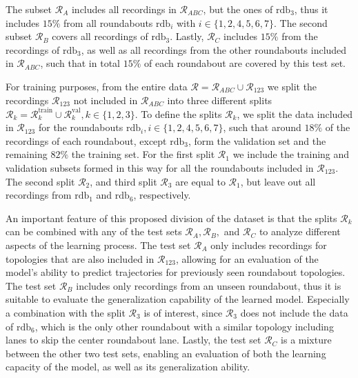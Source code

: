 \documentclass[a4paper, 10pt, conference]{ieeeconf}      %
\begin{document}
The subset $\mathcal{R}_A$ includes all recordings in $\mathcal{R}_{ABC}$, but the ones of $\text{rdb}_3$, thus it includes $15\%$ from all roundabouts $\text{rdb}_i$ with $i \in \{1,2,4,5,6,7\}$.
The second subset $\mathcal{R}_B$ covers all recordings of $\text{rdb}_3$.
Lastly, $\mathcal{R}_C$ includes $15\%$ from the recordings of $\text{rdb}_3$, as well as all recordings from the other roundabouts included in $\mathcal{R}_{ABC}$, such that in total $15\%$ of each roundabout are covered by this test set.


For training purposes, from the entire data \mbox{$\mathcal R = \mathcal R_{ABC} \cup \mathcal R_{123}$} we split the recordings $\mathcal R_{123}$ not included in $\mathcal{R}_{ABC}$ into three different splits \mbox{$\mathcal R_k={\mathcal R}_k^{\text{train}} \cup {\mathcal R}^\text{val}_k, k \in \{1,2,3\}$}.
To define the splits $\mathcal R_k$, we split the data included in $\mathcal R_{123}$ for the roundabouts $\text{rdb}_i, i \in \{1,2,4,5,6,7\}$, such that around $18\%$ of the recordings of each roundabout, except $\text{rdb}_3$, form the validation set and the remaining $82\%$ the training set.
For the first split $\mathcal R_1$ we include the training and validation subsets formed in this way for all the roundabouts included in $\mathcal R_{123}$.
The second split $\mathcal R_2$, and third split $\mathcal R_3$ are equal to $\mathcal R_1$, but leave out all recordings from $\text{rdb}_1$ and $\text{rdb}_6$, respectively.

An important feature of this proposed division of the dataset is that the splits $\mathcal R_{k}$ can be combined with any of the test sets $\mathcal R_A, \mathcal R_B,$ and $\mathcal R_C$ to analyze different aspects of the learning process.
The test set $\mathcal R_A$ only includes recordings for topologies that are also included in $\mathcal R_{123}$, allowing for an evaluation of the model's ability to predict trajectories for previously seen roundabout topologies.
The test set $\mathcal R_B$ includes only recordings from an unseen roundabout, thus it is suitable to evaluate the generalization capability of the learned model.
Especially a combination with the split $\mathcal R_3$ is of interest, since $\mathcal R_3$ does not include the data of $\text{rdb}_6$, which is the only other roundabout with a similar topology including lanes to skip the center roundabout lane.
Lastly, the test set $\mathcal R_C$ is a mixture between the other two test sets, enabling an evaluation of both the learning capacity of the model, as well as its generalization ability.
\end{document}
